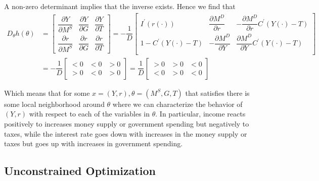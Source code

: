 \documentclass{article}
\begin{document}
A non-zero determinant implies that the inverse exists. Hence we find that
\begin{align*}
  D_\theta h(\theta)
  & =
  \left[\begin{matrix}
      \dfrac{\partial Y}{\partial M^S}
    & \dfrac{\partial Y}{\partial G}
    & \dfrac{\partial Y}{\partial T} \\[6pt]
      \dfrac{\partial r}{\partial M^S}
    & \dfrac{\partial r}{\partial G}
    & \dfrac{\partial r}{\partial T}
  \end{matrix}\right]
  =
  - \dfrac{1}{D}
  \left[\begin{matrix}
        I^\prime(r(\cdot))
    &   \dfrac{\partial M^D}{\partial r}
    & - \dfrac{\partial M^D}{\partial r} C^\prime(Y(\cdot) - T)
    \\[6pt]
        1 - C^\prime(Y(\cdot) - T)
    & - \dfrac{\partial M^D}{\partial Y}
    &   \dfrac{\partial M^D}{\partial Y} C^\prime(Y(\cdot) - T)
    \\[6pt]
  \end{matrix}\right] \\
  & =
  - \dfrac{1}{D}
  \left[\begin{matrix}
      < 0
    & < 0
    & > 0 \\[6pt]
      > 0
    & < 0
    & > 0
  \end{matrix}\right]
  =
  \dfrac{1}{D}
  \left[\begin{matrix}
      > 0
    & > 0
    & < 0 \\[6pt]
      < 0
    & > 0
    & < 0
  \end{matrix}\right]
\end{align*}

Which means that for some $x = (Y, r), \theta = (M^S, G, T)$ that satisfies  there is some local neighborhood around $\theta$ where we can characterize the behavior of $(Y, r)$ with respect to each of the variables in $\theta$. In particular, income reacts positively to increases money supply or government spending but negatively to taxes, while the interest rate goes down with increases in the money supply or taxes but goes up with increases in government spending.

\subsection{Unconstrained Optimization}
\label{sub:unconstrained_optimization}
\end{document}
